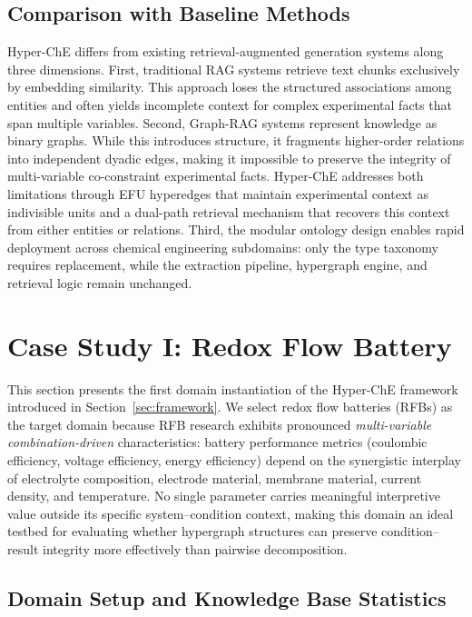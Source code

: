 \documentclass[11pt,a4paper]{article}
\begin{document}
\subsection{Comparison with Baseline Methods}
\label{subsec:comparison}

Hyper-ChE differs from existing retrieval-augmented generation systems along three dimensions. First, traditional RAG systems retrieve text chunks exclusively by embedding similarity. This approach loses the structured associations among entities and often yields incomplete context for complex experimental facts that span multiple variables. Second, Graph-RAG systems represent knowledge as binary graphs. While this introduces structure, it fragments higher-order relations into independent dyadic edges, making it impossible to preserve the integrity of multi-variable co-constraint experimental facts. Hyper-ChE addresses both limitations through EFU hyperedges that maintain experimental context as indivisible units and a dual-path retrieval mechanism that recovers this context from either entities or relations. Third, the modular ontology design enables rapid deployment across chemical engineering subdomains: only the type taxonomy requires replacement, while the extraction pipeline, hypergraph engine, and retrieval logic remain unchanged.


\section{Case Study I: Redox Flow Battery}
\label{sec:case1}

This section presents the first domain instantiation of the Hyper-ChE framework introduced in Section~\ref{sec:framework}. We select redox flow batteries (RFBs) as the target domain because RFB research exhibits pronounced \emph{multi-variable combination-driven} characteristics: battery performance metrics (coulombic efficiency, voltage efficiency, energy efficiency) depend on the synergistic interplay of electrolyte composition, electrode material, membrane material, current density, and temperature. No single parameter carries meaningful interpretive value outside its specific system--condition context, making this domain an ideal testbed for evaluating whether hypergraph structures can preserve condition--result integrity more effectively than pairwise decomposition.

\subsection{Domain Setup and Knowledge Base Statistics}
\label{subsec:flow_battery_setup}
\end{document}
